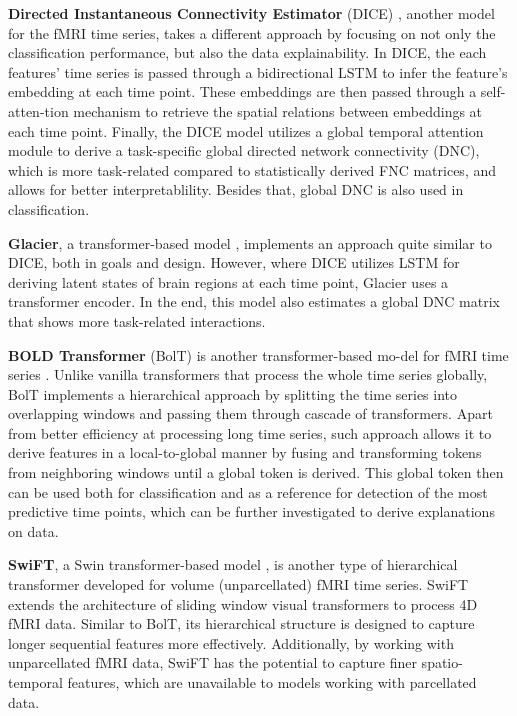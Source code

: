 \documentclass[final,5p,times,twocolumn,authoryear]{elsarticle}
\begin{document}
\noindent \textbf{Directed Instantaneous Connectivity Estimator} (DICE) \citep{dice}, another model for the fMRI time series, takes a different approach by focusing on not only the classification performance, but also the data explainability. In DICE, the each features' time series is passed through a bidirectional LSTM to infer the feature's embedding at each time point. These embeddings are then passed through a self-atten-tion mechanism to retrieve the spatial relations between embeddings at each time point. Finally, the DICE model utilizes a global temporal attention module to derive a task-specific global directed network connectivity (DNC), which is more task-related compared to statistically derived FNC matrices, and allows for better interpretablility. Besides that, global DNC is also used in classification.

\noindent \textbf{Glacier}, a transformer-based model \citep{mahmood2023glacier}, implements an approach quite similar to DICE, both in goals and design. However, where DICE utilizes LSTM for deriving latent states of brain regions at each time point, Glacier uses a transformer encoder. In the end, this model also estimates a global DNC matrix that shows more task-related interactions.

\noindent \textbf{BOLD Transformer} (BolT) is another transformer-based mo-del for fMRI time series \citep{bolt}. Unlike vanilla transformers that process the whole time series globally, BolT implements a hierarchical approach by splitting the time series into overlapping windows and passing them through cascade of transformers. Apart from better efficiency at processing long time series, such approach allows it to derive features in a local-to-global manner by fusing and transforming tokens from neighboring windows until a global token is derived. This global token then can be used both for classification and as a reference for detection of the most predictive time points, which can be further investigated to derive explanations on data. 

\noindent \textbf{SwiFT}, a Swin transformer-based model \citep{swiFT}, is another type of hierarchical transformer developed for volume (unparcellated) fMRI time series. SwiFT extends the architecture of sliding window visual transformers \citep{SwinT} to process 4D fMRI data. Similar to BolT, its hierarchical structure is designed to capture longer sequential features more effectively. Additionally, by working with unparcellated fMRI data, SwiFT has the potential to capture finer spatio-temporal features, which are unavailable to models working with parcellated data.
\end{document}
